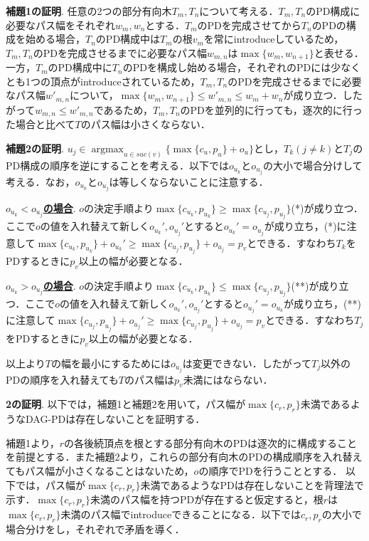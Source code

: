 \documentclass{kuisthesis}           %
\begin{document}
 \textbf{補題1の証明}.
 任意の2つの部分有向木$T_m, T_n$について考える．$T_m, T_n$のPD構成に必要なパス幅をそれぞれ$w_m, w_n$とする．$T_m$のPDを完成させてから$T_n$のPDの構成を始める場合，$T_n$のPD構成中は$T_m$の根$v_m$を常にintroduceしているため，$T_m, T_n$のPDを完成させるまでに必要なパス幅$w_{m,n}$は$ \max\{w_m, w_{n+1}\}$と表せる．一方，$T_m$のPD構成中に$T_n$のPDを構成し始める場合，それぞれのPDには少なくとも1つの頂点がintroduceされているため，$T_m, T_n$のPDを完成させるまでに必要なパス幅$w'_{m,n}$について，$ \max\{w_m, w_{n+1}\} \leq w'_{m,n} \leq w_m+w_n$が成り立つ．したがって$w_{m,n} \leq w'_{m,n}$であるため，$T_m, T_n$のPDを並列的に行っても，逐次的に行った場合と比べて$T$のパス幅は小さくならない．

 \textbf{補題2の証明}.
 $u_j \in \operatorname*{argmax}_{u \in suc(v)} \{\max\{c_u, p_u\}+o_u\}$とし，$T_k (j \neq k)$と$T_j$のPD構成の順序を逆にすることを考える．以下では$o_{u_k}$と$o_{u_j}$の大小で場合分けして考える．なお，$o_{u_k}$と$o_{u_j}$は等しくならないことに注意する．


 \textbf{\underline{$o_{u_k}<o_{u_j}$の場合}}.
 $o$の決定手順より$ \max\{c_{u_k}, p_{u_k}\} \geq  \max\{c_{u_j}, p_{u_j}\}$(*)が成り立つ．ここで$o$の値を入れ替えて新しく$o_{u_k}', o_{u_j}'$とすると$o_{u_k}'=o_{u_j}$が成り立ち，(*)に注意して$ \max \{c_{u_k}, p_{u_k}\}+o_{u_k}' \geq  \max \{c_{u_j}, p_{u_j}\}+o_{u_j}=p_v$とできる．すなわち$T_k$をPDするときに$p_v$以上の幅が必要となる．

 \textbf{\underline{$o_{u_k}>o_{u_j}$の場合}}.
 $o$の決定手順より$ \max\{c_{u_k}, p_{u_k}\} \leq  \max\{c_{u_j}, p_{u_j}\}$(**)が成り立つ．ここで$o$の値を入れ替えて新しく$o_{u_k}', o_{u_j}'$とすると$o_{u_j}'=o_{u_k}$が成り立ち，(**)に注意して$ \max\{c_{u_j}, p_{u_j}\}+o_{u_j}' \geq  \max\{c_{u_j}, p_{u_j}\}+o_{u_j}=p_v$とできる．すなわち$T_j$をPDするときに$p_v$以上の幅が必要となる．
 
 以上より$T$の幅を最小にするためには$o_{u_j}$は変更できない．したがって$T_j$以外のPDの順序を入れ替えても$T$のパス幅は$p_v$未満にはならない．

 
 \textbf{2の証明}.
 以下では，補題1と補題2を用いて，パス幅が$ \max\{c_r, p_r\}$未満であるようなDAG-PDは存在しないことを証明する．

 補題1より，$r$の各後続頂点を根とする部分有向木のPDは逐次的に構成することを前提とする．また補題2より，これらの部分有向木のPDの構成順序を入れ替えてもパス幅が小さくなることはないため，$o$の順序でPDを行うこととする．
 以下では，パス幅が$ \max\{c_r, p_r\}$未満であるようなPDは存在しないことを背理法で示す．$ \max\{c_r, p_r\}$未満のパス幅を持つPDが存在すると仮定すると，根$r$は$ \max\{c_r, p_r\}$未満のパス幅でintroduceできることになる．以下では$c_r, p_r$の大小で場合分けをし，それぞれで矛盾を導く．
\end{document}
